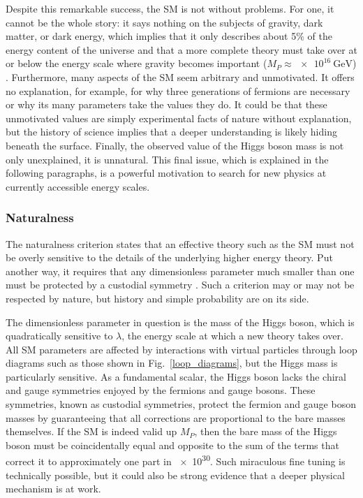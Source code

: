 Despite this remarkable success, the SM is not without problems. For one, it cannot be the whole story: it says nothing on the subjects of gravity, dark matter, or dark energy, which implies that it only describes about 5\% of the energy content of the universe  and that a more complete theory must take over at or below the energy scale where gravity becomes important ($M_{P}\approx\SI{e16}{\GeV}$) . Furthermore, many aspects of the SM seem arbitrary and unmotivated. It offers no explanation, for example, for why three generations of fermions are necessary or why its many parameters take the values they do. It could be that these unmotivated values are simply experimental facts of nature without explanation, but the history of science implies that a deeper understanding is likely hiding beneath the surface. Finally, the observed value of the Higgs boson mass is not only unexplained, it is unnatural. This final issue, which is explained in the following paragraphs, is a powerful motivation to search for new physics at currently accessible energy scales.

\subsubsection{Naturalness}
The naturalness criterion states that an effective theory such as the SM must not be overly sensitive to the details of the underlying higher energy theory. Put another way, it requires that any dimensionless parameter much smaller than one must be protected by a custodial symmetry . Such a criterion may or may not be respected by nature, but history and simple probability are on its side.

The dimensionless parameter in question is the mass of the Higgs boson, which is quadratically sensitive to $\lambda$, the energy scale at which a new theory takes over. All SM parameters are affected by interactions with virtual particles through loop diagrams such as those shown in Fig.~\ref{loop_diagrams}, but the Higgs mass is particularly sensitive. As a fundamental scalar, the Higgs boson lacks the chiral and gauge symmetries enjoyed by the fermions and gauge bosons. These symmetries, known as custodial symmetries, protect the fermion and gauge boson masses by guaranteeing that all corrections are proportional to the bare masses themselves. If the SM is indeed valid up $M_{P}$, then the bare mass of the Higgs boson must be coincidentally equal and opposite to the sum of the terms that correct it to approximately one part in \num{e30}. Such miraculous fine tuning is technically possible, but it could also be strong evidence that a deeper physical mechanism is at work.


